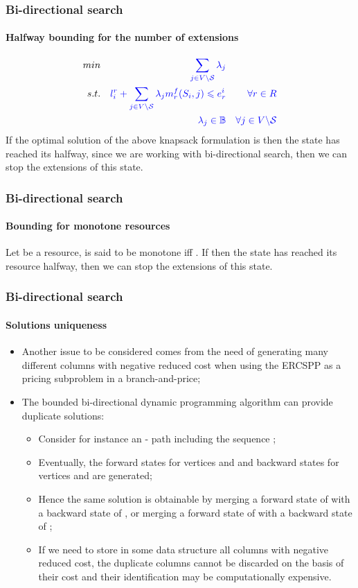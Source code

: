 \begin{frame}
  \frametitle{Bi-directional search}
  \framesubtitle{Halfway bounding for the number of extensions}
  \begin{align} 
    \textcolor{black}{min}  && \color{blue}\sum_{j \in V \backslash \mathcal{S}} \lambda_j && \\
    \textcolor{black}{s.t.} && \color{blue}l_i^r + \sum_{j \in V \backslash \mathcal{S}} \lambda_j m^f_r(S_i, j) \leqslant e_r^i && \color{blue}\forall r \in R \\
                            && \color{blue}\lambda_j \in \mathbb{B} && \color{blue}\forall j \in V \backslash \mathcal{S} 
  \end{align}
  If the optimal solution  of the above knapsack formulation is  then the state  has reached its halfway, since we are working with bi-directional search, then we can stop the extensions of this state.
\end{frame}

\begin{frame}
  \frametitle{Bi-directional search}
  \framesubtitle{Bounding for monotone resources}
  Let  be a resource,  is said to be monotone iff  .
  If  then the state  has reached its resource halfway, then we can stop the extensions of this state.
\end{frame}

\begin{frame}
  \frametitle{Bi-directional search}
  \framesubtitle{Solutions uniqueness}
  \begin{itemize}
    \item Another issue to be considered comes from the need of generating many different columns with negative reduced cost when using the ERCSPP as a pricing subproblem in a branch-and-price;
    \item The bounded bi-directional dynamic programming algorithm can provide duplicate solutions: 
      \begin{itemize}
        \item Consider for instance an - path including the sequence ;
        \item Eventually, the forward states for vertices  and  and backward states for vertices  and  are generated;
        \item Hence the same solution is obtainable by merging a forward state of  with a backward state of ,
          or merging a forward state of  with a backward state of ;
        \item If we need to store in some data structure all columns with negative reduced cost, the duplicate columns cannot be discarded on the basis of their cost and their identification may be computationally expensive.
      \end{itemize}
  \end{itemize}
\end{frame}

